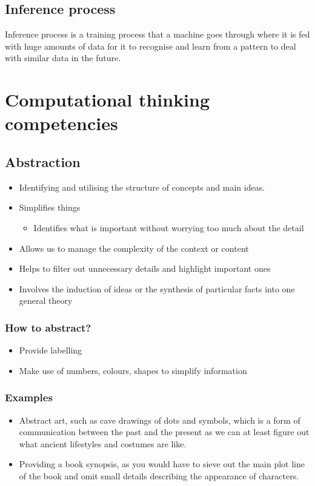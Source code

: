 \documentclass[11pt]{article}
\begin{document}
\subsection{Inference process}
\label{sec:org8517a56}
Inference process is a training process that a machine goes through where it is fed with huge amounts of data for it to recognise and learn from a pattern to deal with similar data in the future.


\section{Computational thinking competencies}
\label{sec:orgdd5251e}

\subsection{Abstraction}
\label{sec:org15eaee8}
\begin{itemize}
\item Identifying and utilising the structure of concepts and main ideas.
\item Simplifies things
\begin{itemize}
\item Identifies what is important without worrying too much about the detail
\end{itemize}
\item Allows us to manage the complexity of the context or content
\item Helps to filter out unnecessary details and highlight important ones
\item Involves the induction of ideas or the synthesis of particular facts into one general theory
\end{itemize}

\subsubsection{How to abstract?}
\label{sec:orgcf70102}
\begin{itemize}
\item Provide labelling
\item Make use of numbers, colours, shapes to simplify information
\end{itemize}

\subsubsection{Examples}
\label{sec:orge49c76b}
\begin{itemize}
\item Abstract art, such as cave drawings of dots and symbols, which is a form of communication between the past and the present as we can at least figure out what ancient lifestyles and costumes are like.
\item Providing a book synopsis, as you would have to sieve out the main plot line of the book and omit small details describing the appearance of characters.
\end{itemize}
\end{document}
